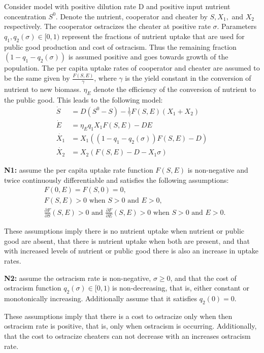 \documentclass[12pt]{article}
\begin{document}
Consider model with positive dilution rate D and positive input nutrient concentration $S^0$. Denote the nutrient, cooperator and cheater by $S, X_1,$ and $X_2$ respectively. The cooperator ostracizes the cheater at positive rate $\sigma$. Parameters $q_1, q_2(\sigma ) \in [0,1)$ represent the fractions of nutrient uptake that are used for public good production and cost of ostracism. Thus the remaining fraction $(1-q_1-q_2(\sigma ))$ is assumed positive and goes towards growth of the population. The per capita uptake rates of cooperator and cheater are assumed to be the same given by $\frac{F(S,E)}{\gamma}$, where $\gamma$ is the yield constant in the conversion of nutrient to new biomass. $\eta_E$ denote the efficiency of the conversion of nutrient to the public good. 
\noindent This leads to the following model: 
\begin{align}
\dot{S}&=D(S^0-S)-\frac{1}{\gamma}F(S,E)(X_1 + X_2)\\
\dot{E}&=\eta_E q_1 X_1 F(S,E)-DE\\
\dot{X_1} &= X_1((1-q_1-q_2(\sigma ))F(S,E)-D)\\
\dot{X_2}&=X_2(F(S,E)-D- X_1 \sigma)
\end{align}

\noindent \textbf{N1:} assume the per capita uptake rate function $F(S,E)$ is non-negative and twice continuously differentiable and satisfies the following assumptions: 
\begin{align*}
&F(0,E)=F(S,0)=0,\\
&F(S,E)>0 \text{ when } S>0 \text{ and } E>0,\\
&\frac{\partial F}{\partial S}(S,E)>0 \text{ and } \frac{\partial F}{\partial E}(S,E)>0 \text { when } S>0 \text{ and } E>0.
\end{align*}

These assumptions imply there is no nutrient uptake when nutrient or public good are absent, that there is nutrient uptake when both are present, and that with increased levels of nutrient or public good there is also an increase in uptake rates. 

\noindent \textbf{N2: }  assume the ostracism rate is non-negative, $\sigma \geq 0$, and that the cost of ostracism function $q_2(\sigma ) \in [0,1)$ is non-decreasing, that is, either constant or monotonically increasing. Additionally assume that it satisfies $q_2(0)=0$. 

These assumptions imply that there is a cost to ostracize only when then ostracism rate is positive, that is, only when ostracism is occurring. Additionally, that the cost to ostracize cheaters can not decrease with an increases ostracism rate.
\end{document}
